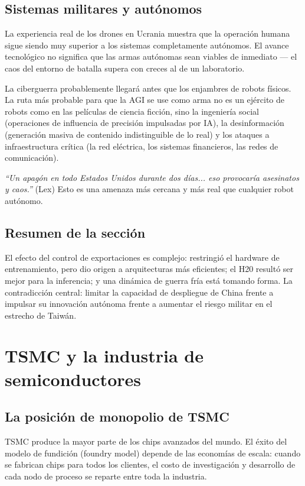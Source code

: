\documentclass[a4paper]{article}
\begin{document}
\subsection{Sistemas militares y autónomos}

La experiencia real de los drones en Ucrania muestra que la operación humana sigue siendo muy superior a los sistemas completamente autónomos. El avance tecnológico no significa que las armas autónomas sean viables de inmediato — el caos del entorno de batalla supera con creces al de un laboratorio.

La ciberguerra probablemente llegará antes que los enjambres de robots físicos. La ruta más probable para que la AGI se use como arma no es un ejército de robots como en las películas de ciencia ficción, sino la ingeniería social (operaciones de influencia de precisión impulsadas por IA), la desinformación (generación masiva de contenido indistinguible de lo real) y los ataques a infraestructura crítica (la red eléctrica, los sistemas financieros, las redes de comunicación).

\textit{``Un apagón en todo Estados Unidos durante dos días... eso provocaría asesinatos y caos.''} (Lex) Esto es una amenaza más cercana y más real que cualquier robot autónomo.

\subsection{Resumen de la sección}

El efecto del control de exportaciones es complejo: restringió el hardware de entrenamiento, pero dio origen a arquitecturas más eficientes; el H20 resultó ser mejor para la inferencia; y una dinámica de guerra fría está tomando forma. La contradicción central: limitar la capacidad de despliegue de China frente a impulsar su innovación autónoma frente a aumentar el riesgo militar en el estrecho de Taiwán.

\section{TSMC y la industria de semiconductores}

\subsection{La posición de monopolio de TSMC}

TSMC produce la mayor parte de los chips avanzados del mundo. El éxito del modelo de fundición (foundry model) depende de las economías de escala: cuando se fabrican chips para todos los clientes, el costo de investigación y desarrollo de cada nodo de proceso se reparte entre toda la industria.
\end{document}
